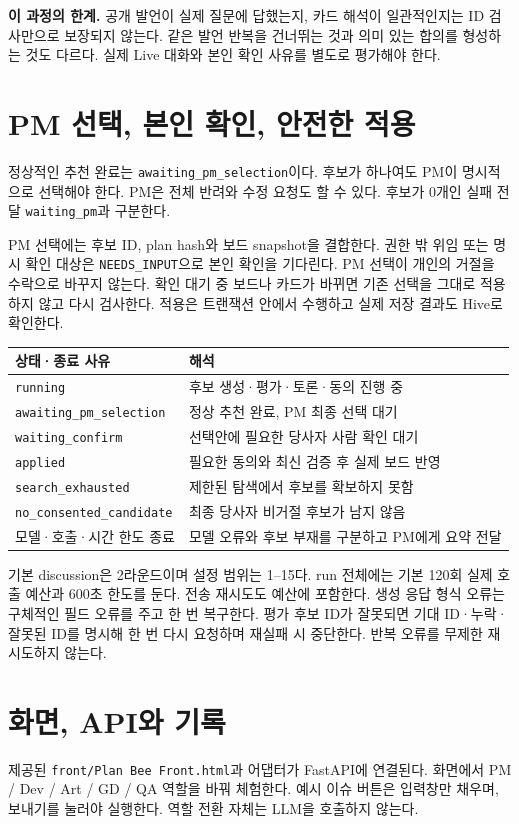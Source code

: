 \documentclass[11pt,a4paper]{article}
\begin{document}
\textbf{이 과정의 한계.} 공개 발언이 실제 질문에 답했는지, 카드 해석이 일관적인지는 ID 검사만으로 보장되지 않는다. 같은 발언 반복을 건너뛰는 것과 의미 있는 합의를 형성하는 것도 다르다. 실제 Live 대화와 본인 확인 사유를 별도로 평가해야 한다.

\newpage
\section{PM 선택, 본인 확인, 안전한 적용}
정상적인 추천 완료는 \texttt{awaiting\_pm\_selection}이다. 후보가 하나여도 PM이 명시적으로 선택해야 한다. PM은 전체 반려와 수정 요청도 할 수 있다. 후보가 0개인 실패 전달 \texttt{waiting\_pm}과 구분한다.

PM 선택에는 후보 ID, plan hash와 보드 snapshot을 결합한다. 권한 밖 위임 또는 명시 확인 대상은 \texttt{NEEDS\_INPUT}으로 본인 확인을 기다린다. PM 선택이 개인의 거절을 수락으로 바꾸지 않는다. 확인 대기 중 보드나 카드가 바뀌면 기존 선택을 그대로 적용하지 않고 다시 검사한다. 적용은 트랜잭션 안에서 수행하고 실제 저장 결과도 Hive로 확인한다.

\begin{tabularx}{\linewidth}{@{}p{46mm}Y@{}}\toprule
상태·종료 사유 & 해석\\\midrule
\texttt{running} & 후보 생성·평가·토론·동의 진행 중\\
\texttt{awaiting\_pm\_selection} & 정상 추천 완료, PM 최종 선택 대기\\
\texttt{waiting\_confirm} & 선택안에 필요한 당사자 사람 확인 대기\\
\texttt{applied} & 필요한 동의와 최신 검증 후 실제 보드 반영\\
\texttt{search\_exhausted} & 제한된 탐색에서 후보를 확보하지 못함\\
\texttt{no\_consented\_candidate} & 최종 당사자 비거절 후보가 남지 않음\\
모델·호출·시간 한도 종료 & 모델 오류와 후보 부재를 구분하고 PM에게 요약 전달\\\bottomrule
\end{tabularx}

기본 discussion은 2라운드이며 설정 범위는 1--15다. run 전체에는 기본 120회 실제 호출 예산과 600초 한도를 둔다. 전송 재시도도 예산에 포함한다. 생성 응답 형식 오류는 구체적인 필드 오류를 주고 한 번 복구한다. 평가 후보 ID가 잘못되면 기대 ID·누락·잘못된 ID를 명시해 한 번 다시 요청하며 재실패 시 중단한다. 반복 오류를 무제한 재시도하지 않는다.

\section{화면, API와 기록}
제공된 \texttt{front/Plan Bee Front.html}과 어댑터가 FastAPI에 연결된다. 화면에서 PM / Dev / Art / GD / QA 역할을 바꿔 체험한다. 예시 이슈 버튼은 입력창만 채우며, 보내기를 눌러야 실행한다. 역할 전환 자체는 LLM을 호출하지 않는다.
\end{document}
